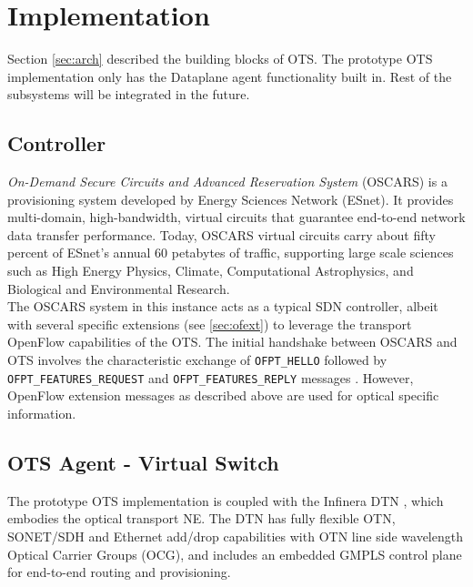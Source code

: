 \documentclass{sig-alternate-2013}
\begin{document}
\vfill\eject
\section{Implementation}
\label{sec:design}
 Section \ref{sec:arch} described the building blocks of OTS. The prototype OTS implementation only has the 
 Dataplane agent functionality built in. Rest of the subsystems will be integrated in the future. 

 \subsection{Controller}
 \label{sec:oscars}
 \textit{On-Demand Secure Circuits and Advanced Reservation System} (OSCARS) \cite{Guok2008} is a provisioning system developed by Energy Sciences Network (ESnet). 
 It provides multi-domain, high-bandwidth, virtual circuits that guarantee end-to-end network data transfer performance. Today, OSCARS virtual circuits carry about fifty 
 percent of ESnet's annual 60 petabytes of traffic, supporting large scale sciences such as High Energy Physics, Climate, Computational Astrophysics, and Biological and Environmental Research.\\
 
 The OSCARS system in this instance acts as a typical SDN controller, albeit with several specific extensions (see \ref{sec:ofext}) to leverage the transport OpenFlow capabilities 
 of the OTS.  The initial handshake between OSCARS and OTS involves the characteristic exchange of \texttt{OFPT\_HELLO} followed by \texttt{OFPT\_FEATURES\_REQUEST} and 
 \texttt{OFPT\_FEATURES\_REPLY} messages \cite{OF1.0}. However, OpenFlow extension messages as described above are used for optical specific information.
 
 \subsection{OTS Agent - Virtual Switch}
 \label{sec:otvs}
 
 The prototype OTS implementation is coupled with the Infinera DTN \cite{DTN}, which embodies the optical transport NE.  The DTN has fully
 flexible OTN, SONET/SDH and Ethernet add/drop capabilities with OTN \cite{otn} line side wavelength Optical Carrier Groups (OCG), and includes an 
 embedded GMPLS control plane for end-to-end routing and provisioning. \\
 
\end{document}
